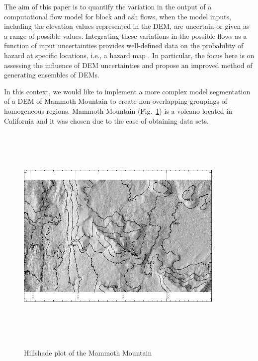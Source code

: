 \documentclass[12pt,letterpaper]{article}
\begin{document}
The aim of this paper is to quantify the variation in the output of a computational flow model for 
block and ash flows, when the model inputs, including the elevation values represented in the DEM, are
uncertain or given as a range of possible values. Integrating these variations in the possible flows 
as a function of input uncertainties provides well-defined data on the probability of hazard at
specific locations, i.e., a hazard map \citep{Keith}.  In particular, the focus here is on assessing the 
influence of DEM uncertainties and propose an improved method of generating ensembles of DEMs.

In this context, we would like to implement a more complex model segmentation of a DEM of Mammoth 
Mountain to create non-overlapping groupings of homogeneous regions. Mammoth Mountain (Fig.~\ref{fig:fig1}) 
is a volcano located in California and it was chosen due to the ease of obtaining data sets. 
\begin{figure}[ht!]
\center
      \includegraphics[width=10cm,height=11cm,keepaspectratio]{figs/Topsar5.png}\\
  \caption{Hillshade plot of the Mammoth Mountain  }\label{fig:fig1}
\end{figure}
\end{document}
